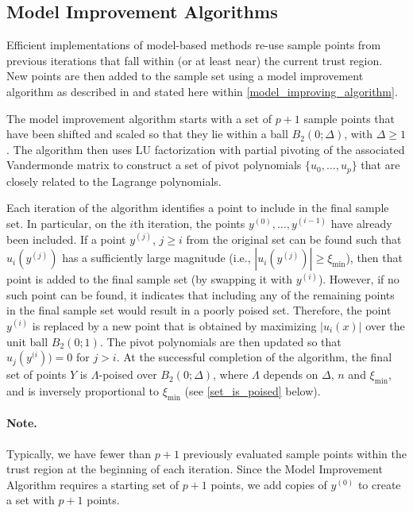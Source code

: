 \documentclass{article}
\begin{document}
\subsection{Model Improvement Algorithms}

\label{model_improvement_algorithms}
Efficient implementations of model-based methods re-use sample points from previous iterations that fall within (or at least near) the current trust region.
New points are then added to the sample set using a model improvement algorithm as described in 
\cite{introduction_book} and stated here within \cref{model_improving_algorithm}.

The model improvement algorithm starts with a set of $p+1$ sample points that have been shifted and scaled so that they lie within a ball $B_2(0;\Delta)$, with $\Delta \ge 1$.   
The algorithm then uses LU factorization with partial pivoting of the 
associated Vandermonde matrix to construct a set of pivot polynomials $\{u_0, \ldots, u_p\}$ that are closely related to the Lagrange polynomials. 


Each iteration of the algorithm identifies a point to include in the final sample set.
In particular, on the $i$th iteration, the points $y^{(0)}, \ldots, y^{(i-1)}$ have already been included.   
If a point $y^{(j)}$,  $j \ge i$ from the original set can be found such that 
$u_i(y^{(j)})$ has a sufficiently large magnitude  (i.e.,  $|u_i(y^{(j)})| \ge \xi_{\min}$),  
then that point is added to the final sample set (by swapping it with $y^{(i)}$).
However, if no such point can be found, 
it indicates that including any of the remaining points in the final sample set would result in a poorly poised set.
Therefore, the point $y^{(i)}$ is replaced by a new point that is obtained by maximizing $|u_i(x)|$ 
over the unit ball $B_2(0;1)$.
The pivot polynomials are then updated so that 
$u_j(y^{(i})) = 0$ for $j > i$.
At the successful completion of the algorithm, the final set of points $Y$ is $\Lambda$-poised over $B_2(0;\Delta)$,
where $\Lambda$ depends on $\Delta$,  $n$ and $\xi_{\min}$,  and is inversely proportional to $\xi_{\min}$
(see \cref{set_is_poised} below).

\paragraph*{Note.}
Typically,  we have fewer than $p+1$ previously evaluated sample points within the trust region at the beginning of each iteration.
Since the Model Improvement Algorithm requires a starting set of $p+1$ points, 
we add copies of $y^{(0)}$ to create a set with $p+1$ points.
\end{document}
